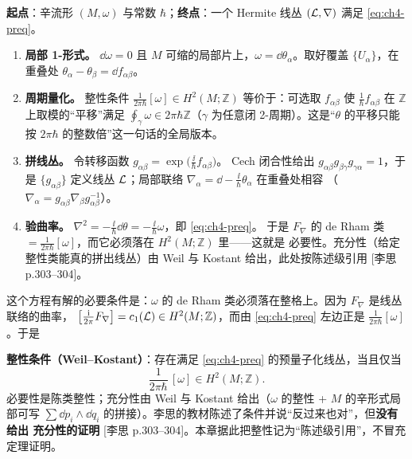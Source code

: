 \begin{derivation}[D-4.1：从整性条件造出预量子化线丛（四步）]
\textbf{起点}：辛流形 $(M,\omega)$ 与常数 $\hbar$；\textbf{终点}：一个 Hermite 线丛 $(\mathcal{L},\nabla)$ 满足
\eqref{eq:ch4-preq}。
\begin{enumerate}[label=\textbf{步 \arabic*.},leftmargin=2.8em]
\item \textbf{局部 1-形式。} $\dd\omega=0$ 且 $M$ 可缩的局部片上，$\omega=\dd\theta_\alpha$。取好覆盖
$\{U_\alpha\}$，在重叠处 $\theta_\alpha-\theta_\beta=\dd f_{\alpha\beta}$。
\item \textbf{周期量化。} 整性条件 $\frac{1}{2\pi\hbar}[\omega]\in H^2(M;\mathbb Z)$ 等价于：可选取
$f_{\alpha\beta}$ 使 $\frac{1}{\hbar}f_{\alpha\beta}$ 在 $\mathbb Z$ 上取模的“平移”满足
$\oint_\gamma\omega\in 2\pi\hbar\mathbb Z$（$\gamma$ 为任意闭 2-周期）。这是“$\theta$ 的平移只能按
$2\pi\hbar$ 的整数倍”这一句话的全局版本。
\item \textbf{拼线丛。} 令转移函数 $g_{\alpha\beta}=\exp\bigl(\frac{\ii}{\hbar}f_{\alpha\beta}\bigr)$。
Cech 闭合性给出 $g_{\alpha\beta}g_{\beta\gamma}g_{\gamma\alpha}=1$，于是 $\{g_{\alpha\beta}\}$ 定义线丛
$\mathcal{L}$；局部联络 $\nabla_\alpha=\dd-\frac{\ii}{\hbar}\theta_\alpha$ 在重叠处相容
（$\nabla_\alpha=g_{\alpha\beta}\nabla_\beta g_{\alpha\beta}^{-1}$）。
\item \textbf{验曲率。} $\nabla^2=-\frac{\ii}{\hbar}\dd\theta=-\frac{\ii}{\hbar}\omega$，即 \eqref{eq:ch4-preq}。
于是 $F_\nabla$ 的 de Rham 类 $=\frac{1}{2\pi\hbar}[\omega]$，而它必须落在 $H^2(M;\mathbb Z)$ 里——这就是
必要性。充分性（给定整性类能真的拼出线丛）由 Weil 与 Kostant 给出，此处按陈述级引用
[李思 p.303--304]。
\end{enumerate}
\end{derivation}

这个方程有解的必要条件是：$\omega$ 的 de Rham 类必须落在整格上。因为 $F_\nabla$ 是线丛联络的曲率，
$\bigl[\frac{\mathrm{i}}{2\pi}F_\nabla\bigr]=c_1(\mathcal{L})\in H^2(M;\mathbb Z)$，而由 \eqref{eq:ch4-preq}
左边正是 $\frac{1}{2\pi\hbar}[\omega]$。于是

\begin{keypoint}
\textbf{整性条件（Weil--Kostant）}：存在满足 \eqref{eq:ch4-preq} 的预量子化线丛，当且仅当
\begin{equation}
\frac{1}{2\pi\hbar}\,[\omega]\in H^2(M;\mathbb Z).
\end{equation}
必要性是陈类整性；充分性由 Weil 与 Kostant 给出（$\omega$ 的整性 + $M$ 的辛形式局部可写
$\sum\dd p_i\wedge\dd q_i$ 的拼接）。李思的教材陈述了条件并说“反过来也对”，但\textbf{没有给出
充分性的证明} [李思 p.303--304]。本章据此把整性记为“陈述级引用”，不冒充定理证明。
\end{keypoint}

